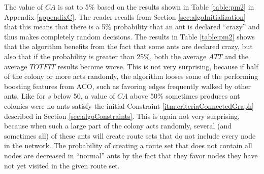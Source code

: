 The value of $CA$ is sat to 5\% based on the results shown in Table \vref{table:pm2} in Appendix \ref{appendixC}. The reader recalls from Section \vref{sec:algoInitialization} that this means that there is a 5\% probability that an ant is declared ``crazy'' and thus makes completely random decisions. The results in Table \vref{table:pm2} shows that the algorithm benefits from the fact that some ants are declared crazy, but also that if the probability is greater than 25\%, both the average $ATT$ and the average $TOTFIT$ results become worse. This is not very surprising, because if half of the colony or more acts randomly, the algorithm looses some of the performing boosting features from ACO, such as favoring edges frequently walked by other ants. Like for $s$ below 50, a value of $CA$ above 50\% sometimes produces ant colonies were no ants satisfy the initial Constraint \ref{itm:criteriaConnectedGraph} described in Section \vref{sec:algoConstraints}. This is again not very surprising, because when such a large part of the colony acts randomly, several (and sometimes all) of these ants will create route sets that do not include every node in the network. The probability of creating a route set that does not contain all nodes are decreased in ``normal'' ants by the fact that they favor nodes they have not yet visited in the given route set. 


